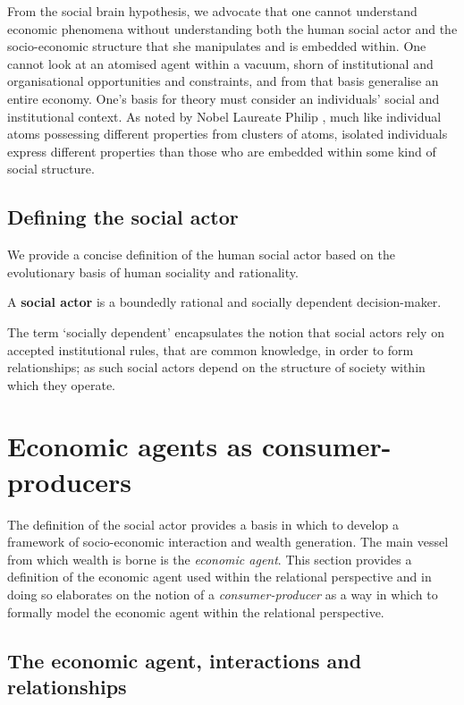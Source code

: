 From the social brain hypothesis, we advocate that one cannot understand economic phenomena without understanding both the human social actor and the socio-economic structure that she manipulates and is embedded within. One cannot look at an atomised agent within a vacuum, shorn of institutional and organisational opportunities and constraints, and from that basis generalise an entire economy. One's basis for theory must consider an individuals' social and institutional context. As noted by Nobel Laureate Philip \citet{Anderson1972}, much like individual atoms possessing different properties from clusters of atoms, isolated individuals express different properties than those who are embedded within some kind of social structure.

\subsection{Defining the social actor}

We provide a concise definition of the human social actor based on the evolutionary basis of human sociality and rationality.

\begin{definition}
A \textbf{social actor} is a boundedly rational and socially dependent decision-maker.
\end{definition}

The term `socially dependent' encapsulates the notion that social actors rely on accepted institutional rules, that are common knowledge, in order to form relationships; as such social actors depend on the structure of society within which they operate.

\section{Economic agents as consumer-producers}
\label{sec:EconomicAgentsAsConsumerProducers}

The definition of the social actor provides a basis in which to develop a framework of socio-economic interaction and wealth generation. The main vessel from which wealth is borne is the \emph{economic agent}. This section provides a definition of the economic agent used within the relational perspective and in doing so elaborates on the notion of a \emph{consumer-producer} as a way in which to formally model the economic agent within the relational perspective.

\subsection{The economic agent, interactions and relationships}

